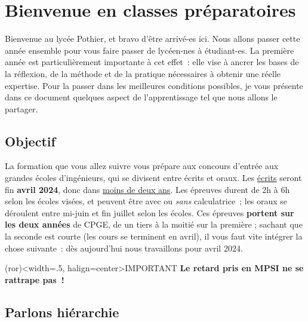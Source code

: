 \documentclass[a4paper, 10pt, final, garamond]{book}
\begin{document}
\setcounter{chapter}{-1}

\chapter*{Bienvenue en classes pr\'eparatoires}

Bienvenue au lycée Pothier, et bravo d'être arrivé-es ici. Nous allons passer
cette année ensemble pour vous faire passer de lycéen-nes à étudiant-es. La
première année est particulièrement importante à cet effet~: elle vise à ancrer
les bases de la réflexion, de la méthode et de la pratique nécessaires à obtenir
une réelle expertise. Pour la passer dans les meilleures conditions possibles,
je vous présente dans ce document quelques aspect de l'apprentissage tel que
nous allons le partager.

\section{Objectif}

\begin{tcbraster}[raster columns=4, raster equal height=rows]
	\begin{tcolorbox}[blankest, raster multicolumn=3]

		La formation que vous allez suivre vous prépare aux concours d'entrée
		aux grandes écoles d'ingénieurs, qui se divisent entre écrits et oraux.
		Les \underline{écrits} seront fin \textbf{avril 2024}, donc dans
		\underline{moins de deux ans}. Les épreuves durent de 2h à 6h selon les
		écoles visées, et peuvent être avec ou \textit{sans} calculatrice~; les
		oraux se déroulent entre mi-juin et fin juillet selon les écoles. Ces
		épreuves \textbf{portent sur les deux années} de CPGE, de un tiers à la
		moitié sur la première ; sachant que la seconde est courte (les cours se
		terminent en avril), il vous faut vite intégrer la chose suivante~: dès
		aujourd'hui nous travaillons pour avril 2024.

	\end{tcolorbox}
	\begin{tcb}[fil](ror)<width=.5\linewidth, halign=center>{IMPORTANT}
		\textbf{Le retard pris en MPSI ne se rattrape pas~!}
	\end{tcb}
\end{tcbraster}

\section{Parlons hiérarchie}
\end{document}
